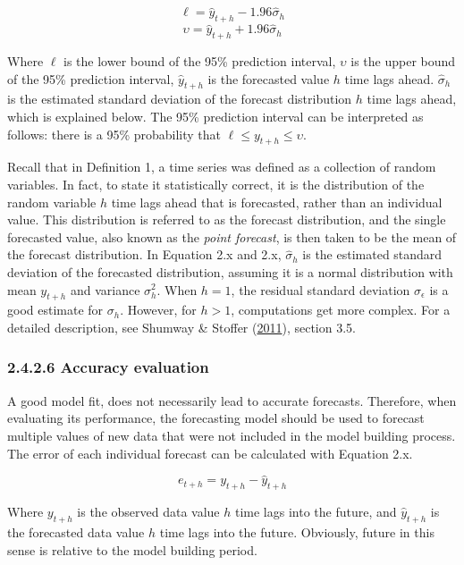 \documentclass[12pt,oneside]{reedthesis}
\begin{document}
\[ \ell = \hat{y}_{t+h} - 1.96\hat\sigma_{h}\]
\[ \upsilon = \hat{y}_{t+h} + 1.96\hat\sigma_{h}\]

Where \(\ell\) is the lower bound of the 95\% prediction interval,
\(\upsilon\) is the upper bound of the 95\% prediction interval,
\(\hat{y}_{t+h}\) is the forecasted value \(h\) time lags ahead.
\(\hat\sigma_{h}\) is the estimated standard deviation of the forecast
distribution \(h\) time lags ahead, which is explained below. The 95\%
prediction interval can be interpreted as follows: there is a 95\%
probability that \(\ell \leq {y}_{t+h} \leq \upsilon\).

Recall that in Definition 1, a time series was defined as a collection
of random variables. In fact, to state it statistically correct, it is
the distribution of the random variable \(h\) time lags ahead that is
forecasted, rather than an individual value. This distribution is
referred to as the forecast distribution, and the single forecasted
value, also known as the \emph{point forecast}, is then taken to be the
mean of the forecast distribution. In Equation 2.x and 2.x,
\(\hat\sigma_{h}\) is the estimated standard deviation of the forecasted
distribution, assuming it is a normal distribution with mean
\({y}_{t+h}\) and variance \(\sigma_{h}^{2}\). When \(h = 1\), the
residual standard deviation \(\sigma_{\epsilon}\) is a good estimate for
\(\sigma_{h}\). However, for \(h > 1\), computations get more complex.
For a detailed description, see Shumway \& Stoffer
(\protect\hyperlink{ref-shumway2011}{2011}), section 3.5.

\subsubsection{2.4.2.6 Accuracy evaluation}\label{accuracy-evaluation}

A good model fit, does not necessarily lead to accurate forecasts.
Therefore, when evaluating its performance, the forecasting model should
be used to forecast multiple values of new data that were not included
in the model building process. The error of each individual forecast can
be calculated with Equation 2.x.

\[ e_{t+h} = y_{t+h} - \hat{y}_{t+h} \]

Where \(y_{t+h}\) is the observed data value \(h\) time lags into the
future, and \(\hat{y}_{t+h}\) is the forecasted data value \(h\) time
lags into the future. Obviously, future in this sense is relative to the
model building period.
\end{document}
